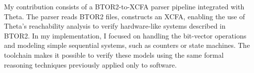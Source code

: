 My contribution consists of a BTOR2-to-XCFA parser pipeline integrated with Theta. The parser reads BTOR2 files, constructs an XCFA, enabling the use of Theta's reachability analysis to verify hardware-like systems described in BTOR2. In my implementation, I focused on handling the bit-vector operations and modeling simple sequential systems, such as counters or state machines. The toolchain makes it possible to verify these models using the same formal reasoning techniques previously applied only to software.
